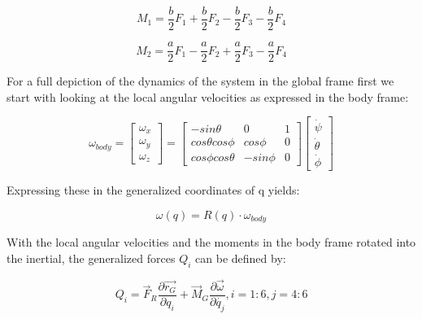 \documentclass[12pt, letterpaper]{article}
\begin{document}
\[
M_{1}=\frac{b}{2}F_{1}+\frac{b}{2}F_{2}-\frac{b}{2}F_{3}-\frac{b}{2}F_{4}
\]

\[
M_{2}=\frac{a}{2}F_{1}-\frac{a}{2}F_{2}+\frac{a}{2}F_{3}-\frac{a}{2}F_{4}
\]

For a full depiction of the dynamics of the system in the global frame
first we start with looking at the local angular velocities as expressed
in the body frame:

\[
\omega_{body}=\left[\begin{array}{c}
\omega_{x}\\
\omega_{y}\\
\omega_{z}
\end{array}\right]=\left[\begin{array}{ccc}
-sin\theta & 0 & 1\\
cos\theta cos\phi & cos\phi & 0\\
cos\phi cos\theta & -sin\phi & 0
\end{array}\right]\left[\begin{array}{c}
\dot{\psi}\\
\dot{\theta}\\
\dot{\phi}
\end{array}\right]
\]

Expressing these in the generalized coordinates of q yields:

\[
\omega(q)=R(q)\cdot\omega_{body}
\]

With the local angular velocities and the moments in the body frame
rotated into the inertial, the generalized forces $Q_{i}$ can
be defined by:

\[
Q_{i}=\overrightarrow{F}_{R}\frac{\partial\overrightarrow{r_{G}}}{\partial q_{i}}+\overrightarrow{M}_{G}\frac{\partial\overrightarrow{\omega}}{\partial\dot{q_{j}}}, i=1:6, j=4:6
\]






\end{document}
